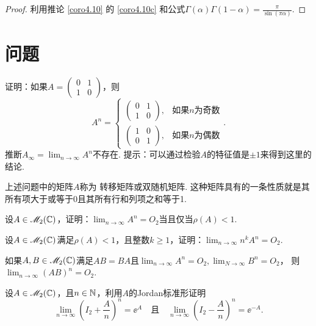 \begin{proof}
  利用推论 \ref{coro4.10} 的 \ref{coro4.10c} 和公式$\Gamma(\alpha)\Gamma(1-\alpha)=\frac\pi{\sin(\pi\alpha)}$.
\end{proof}

\section{问题}
\begin{problem}
  证明：如果$A=\begin{pmatrix}
    0 & 1 \\
    1 & 0
  \end{pmatrix}$，则
  \[
    A^n = \begin{cases}
      \begin{pmatrix}
        0 & 1 \\
        1 & 0
      \end{pmatrix}, & \text{如果$n$为奇数} \\
      \begin{pmatrix}
        1 & 0 \\
        0 & 1
      \end{pmatrix} , & \text{如果$n$为偶数}
    \end{cases}.
  \]
  推断$A_\infty=\lim_{n\to\infty}A^n$不存在. 提示：可以通过检验$A$的特征值是$\pm1$来得到这里的结论.
\end{problem}

\begin{remark}
  上述问题中的矩阵$A$称为 {\kaishu 转移矩阵}或{\kaishu 双随机矩阵}.  这种矩阵具有的一条性质就是其所有项大于或等于0且其所有行和列项之和等于1.
\end{remark}

\begin{problem}
  设$A\in\mathscr M_2(\mathbb C)$，证明：$\lim_{n\to\infty}A^n=O_2$当且仅当$\rho(A)<1$.
\end{problem}

\begin{problem}
  设$A\in\mathscr M_2(\mathbb C)$满足$\rho(A)<1$，且整数$k\ge1$，证明：$\lim_{n\to\infty}n^kA^n=O_2$.
\end{problem}

\begin{problem}
  如果$A,B\in\mathscr M_2(\mathbb C)$满足$AB=BA$且$\lim_{n\to\infty}A^n=O_2,\lim_{N\to\infty}B^n=O_2$，
  则$\lim_{n\to\infty}(AB)^n=O_2$.
\end{problem}

\begin{problem}
  设$A\in\mathscr M_2(\mathbb C)$，且$n\in\mathbb N$，利用$A$的Jordan标准形证明
  \[
    \lim_{n\to\infty}\left( I_2 + \frac An \right)^n = \ee^A \quad \text{且}\quad
    \lim_{n\to\infty}\left( I_2 - \frac An \right)^n = \ee^{-A}.
  \]
\end{problem}

